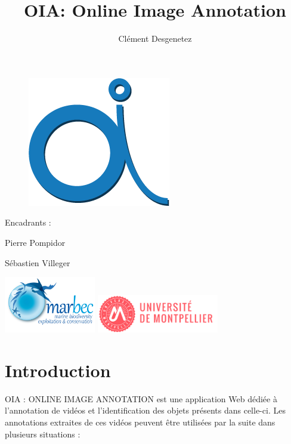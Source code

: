 \documentclass[12pt]{article}
\title{OIA: Online Image Annotation}
\author{Clément Desgenetez}
\date{}
\begin{document}
\maketitle

\begin{figure}[H]
\centering
\includegraphics[scale=1]{img/oia_logo.png}
\end{figure}

\begin{flushright}
\vfill
Encadrants :

Pierre Pompidor

Sébastien Villeger

\includegraphics[width=0.3\textwidth]{img/MARBEC.png}
\includegraphics[width=0.4\textwidth]{img/logo_um.png}
\end{flushright}

\newpage

\tableofcontents

\newpage

\section{Introduction}
OIA : ONLINE IMAGE ANNOTATION est une application Web dédiée à l’annotation de vidéos et l’identification des objets présents dans celle-ci.
Les annotations extraites de ces vidéos peuvent être utilisées par la suite dans plusieurs situations :
\end{document}
